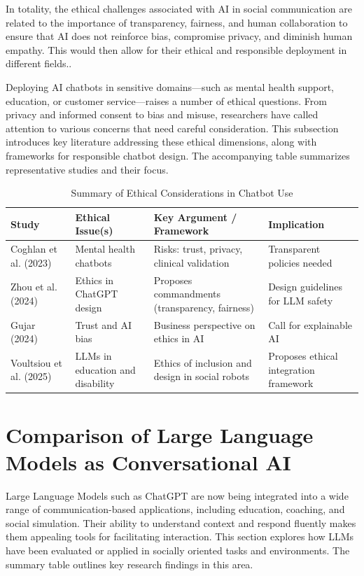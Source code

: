 In totality, the ethical challenges associated with AI in social communication are related to the importance of transparency, fairness, and human collaboration to ensure that AI does not reinforce bias, compromise privacy, and diminish human empathy. This would then allow for their ethical and responsible deployment in different fields..

Deploying AI chatbots in sensitive domains—such as mental health support, education, or customer service—raises a number of ethical questions. From privacy and informed consent to bias and misuse, researchers have called attention to various concerns that need careful consideration. This subsection introduces key literature addressing these ethical dimensions, along with frameworks for responsible chatbot design. The accompanying table summarizes representative studies and their focus.

\begin{table}[H]
\centering
\caption{Summary of Ethical Considerations in Chatbot Use}
\small
\begin{tabular}{p{3.3cm} p{3.7cm} p{3.7cm} p{3.7cm}}
\toprule
\textbf{Study} & \textbf{Ethical Issue(s)} & \textbf{Key Argument / Framework} & \textbf{Implication} \\
\midrule
Coghlan et al. (2023) & Mental health chatbots & Risks: trust, privacy, clinical validation & Transparent policies needed \\
Zhou et al. (2024) & Ethics in ChatGPT design & Proposes commandments (transparency, fairness) & Design guidelines for LLM safety \\
Gujar (2024) & Trust and AI bias & Business perspective on ethics in AI & Call for explainable AI \\
Voultsiou et al. (2025) & LLMs in education and disability & Ethics of inclusion and design in social robots & Proposes ethical integration framework \\
\bottomrule
\end{tabular}
\end{table}

\section{Comparison of Large Language Models as Conversational AI}

Large Language Models such as ChatGPT are now being integrated into a wide range of communication-based applications, including education, coaching, and social simulation. Their ability to understand context and respond fluently makes them appealing tools for facilitating interaction. This section explores how LLMs have been evaluated or applied in socially oriented tasks and environments. The summary table outlines key research findings in this area.

